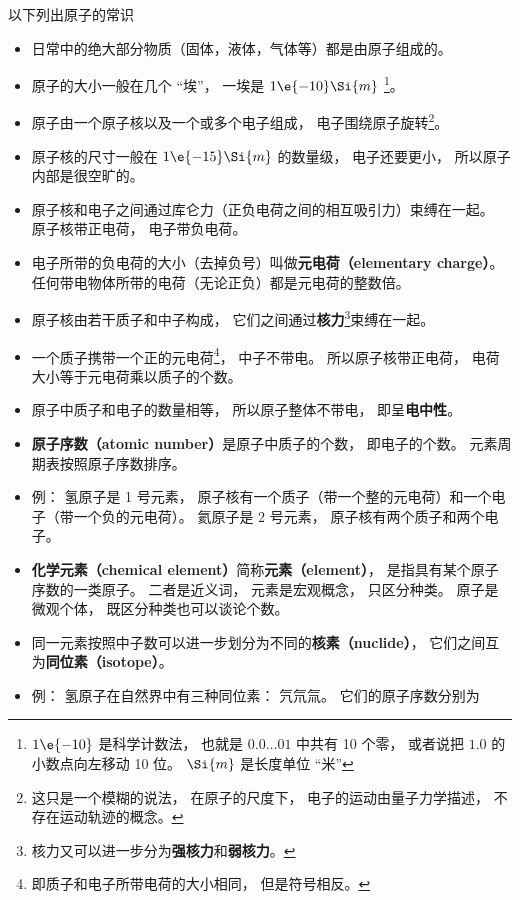
\begin{issues}
\issueDraft
\end{issues}


以下列出原子的常识
\begin{itemize}
\item 日常中的绝大部分物质（固体，液体，气体等）都是由原子组成的。
\item 原子的大小一般在几个 “埃”， 一埃是 $1\e{-10}\Si{m}$ \footnote{$1\e{-10}$ 是科学计数法， 也就是 $0.0\dots01$ 中共有 10 个零， 或者说把 $1.0$ 的小数点向左移动 10 位。 $\Si{m}$ 是长度单位 “米”}。 %
\item 原子由一个原子核以及一个或多个电子组成， 电子围绕原子旋转\footnote{这只是一个模糊的说法， 在原子的尺度下， 电子的运动由量子力学描述， 不存在运动轨迹的概念。}。
\item 原子核的尺寸一般在 $1\e{-15}\Si{m}$ 的数量级， 电子还要更小， 所以原子内部是很空旷的。
\item 原子核和电子之间通过库仑力（正负电荷之间的相互吸引力）束缚在一起。 原子核带正电荷， 电子带负电荷。 %
\item 电子所带的负电荷的大小（去掉负号）叫做\textbf{元电荷（elementary charge）}。 任何带电物体所带的电荷（无论正负）都是元电荷的整数倍。
\item 原子核由若干质子和中子构成， 它们之间通过\textbf{核力}\footnote{核力又可以进一步分为\textbf{强核力}和\textbf{弱核力}。}束缚在一起。
\item 一个质子携带一个正的元电荷\footnote{即质子和电子所带电荷的大小相同， 但是符号相反。}， 中子不带电。 所以原子核带正电荷， 电荷大小等于元电荷乘以质子的个数。
\item 原子中质子和电子的数量相等， 所以原子整体不带电， 即呈\textbf{电中性}。
\item \textbf{原子序数（atomic number）}是原子中质子的个数， 即电子的个数。 元素周期表按照原子序数排序。
\item 例： 氢原子是 1 号元素， 原子核有一个质子（带一个整的元电荷）和一个电子（带一个负的元电荷）。 氦原子是 2 号元素， 原子核有两个质子和两个电子。
\item \textbf{化学元素（chemical element）}简称\textbf{元素（element）}， 是指具有某个原子序数的一类原子。 二者是近义词， 元素是宏观概念， 只区分种类。 原子是微观个体， 既区分种类也可以谈论个数。
\item 同一元素按照中子数可以进一步划分为不同的\textbf{核素（nuclide）}， 它们之间互为\textbf{同位素（isotope）}。
\item 例： 氢原子在自然界中有三种同位素： 氕氘氚。 它们的原子序数分别为
\end{itemize}
